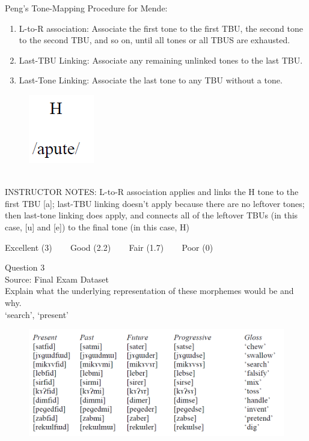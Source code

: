 \documentclass[12pt]{article}
\begin{document}
Peng’s Tone-Mapping Procedure for Mende: \begin{enumerate} \item L-to-R association: Associate the first tone to the first TBU, the second tone to the second TBU, and so on, until all tones or all TBUS are exhausted. \item Last-TBU Linking: Associate any remaining unlinked tones to the last TBU. \item Last-Tone Linking: Associate the last tone to any TBU without a tone. \end{enumerate}

\begin{figure}[H]
\includegraphics{../images/mendetone_b.png}
\end{figure}

~\\
INSTRUCTOR NOTES: L-to-R association applies and links the H tone to the first TBU [a]; last-TBU linking doesn't apply because there are no leftover tones; then last-tone linking does apply, and connects all of the leftover TBUs (in this case, [u] and [e]) to the final tone (in this case, H)


\vfill
Excellent (3) ~~~ Good (2.2) ~~~ Fair (1.7) ~~~ Poor (0)
\newpage

{\large Question 3}\\

Source: Final Exam Dataset\\

Explain what the underlying representation of these morphemes would be and why.\\

`search', `present'

\begin{figure}[H]
\includegraphics{../images/final_dataset.png}
\end{figure}
\end{document}
